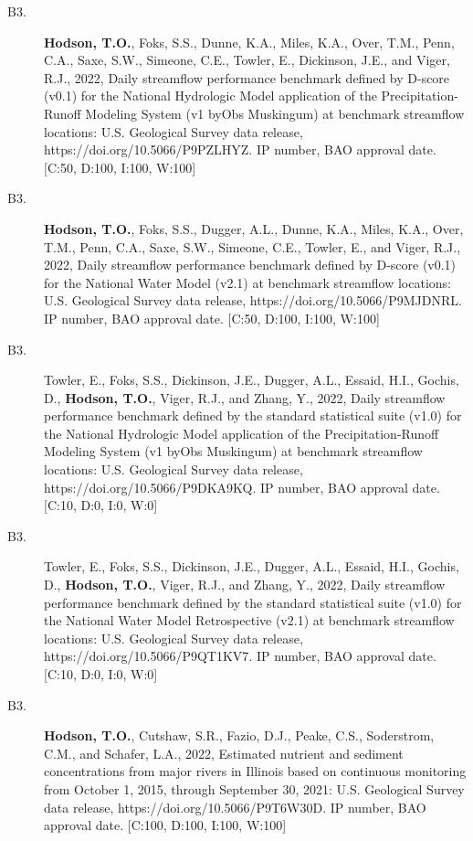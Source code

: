 \documentclass[12pt]{article}
\makeatletter
\def\namedlabel#1#2{\begingroup
	\def\@currentlabel{#2}%
	\label{#1}\endgroup
}
\makeatother
\begin{document}
\begin{description}
    \item[B3.\namedlabel{benchmark_2021a}{B3}]
    \textbf{Hodson, T.O.}, Foks, S.S., Dunne, K.A., Miles, K.A., Over, T.M., Penn, C.A., Saxe, S.W., Simeone, C.E., Towler, E., Dickinson, J.E., and Viger, R.J.,
    2022, Daily streamflow performance benchmark defined by D-score (v0.1) for the National Hydrologic Model application of the Precipitation-Runoff Modeling System (v1 byObs Muskingum) at benchmark streamflow locations:
    U.S. Geological Survey data release, https://doi.org/10.5066/P9PZLHYZ.
    IP number, BAO approval date. [C:50, D:100, I:100, W:100]
    
    \item[B3.\namedlabel{benchmark_2021b}{B3}] 
    \textbf{Hodson, T.O.}, Foks, S.S., Dugger, A.L., Dunne, K.A., Miles, K.A., Over, T.M., Penn, C.A., Saxe, S.W., Simeone, C.E., Towler, E., and Viger, R.J.,
    2022, Daily streamflow performance benchmark defined by D-score (v0.1) for the National Water Model (v2.1) at benchmark streamflow locations:
    U.S. Geological Survey data release, https://doi.org/10.5066/P9MJDNRL.
    IP number, BAO approval date. [C:50, D:100, I:100, W:100]
    
    \item[B3.\namedlabel{benchmark_2021c}{B3}] 
    Towler, E., Foks, S.S., Dickinson, J.E., Dugger, A.L., Essaid, H.I., Gochis, D., \textbf{Hodson, T.O.}, Viger, R.J., and Zhang, Y.,
    2022, Daily streamflow performance benchmark defined by the standard statistical suite (v1.0) for the National Hydrologic Model application of the Precipitation-Runoff Modeling System (v1 byObs Muskingum) at benchmark streamflow locations:
    U.S. Geological Survey data release, https://doi.org/10.5066/P9DKA9KQ.
    IP number, BAO approval date. [C:10, D:0, I:0, W:0]
    
    \item[B3.\namedlabel{benchmark_2021d}{B3}] 
    Towler, E., Foks, S.S., Dickinson, J.E., Dugger, A.L., Essaid, H.I., Gochis, D., \textbf{Hodson, T.O.}, Viger, R.J., and Zhang, Y., 2022,
    Daily streamflow performance benchmark defined by the standard statistical suite (v1.0) for the National Water Model Retrospective (v2.1) at benchmark streamflow locations:
    U.S. Geological Survey data release, https://doi.org/10.5066/P9QT1KV7.
    IP number, BAO approval date. [C:10, D:0, I:0, W:0]
    
    \item[B3. \namedlabel{supergages_dr2}{B3}] \textbf{Hodson, T.O.}, Cutshaw, S.R., Fazio, D.J., Peake, C.S., Soderstrom, C.M., and Schafer, L.A.,
    2022, Estimated nutrient and sediment concentrations from major rivers in Illinois based on continuous monitoring from October 1, 2015, through September 30, 2021:
    U.S. Geological Survey data release, https://doi.org/10.5066/P9T6W30D.
    IP number, BAO approval date. [C:100, D:100, I:100, W:100]
    

\end{description}
\end{document}
